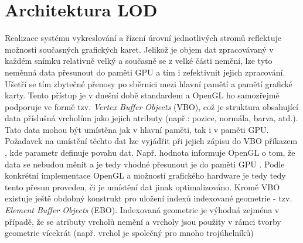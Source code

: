 \section{Architektura LOD}
\label{sec-LODarchitecture}
Realizace systému vykreslování a řízení úrovní jednotlivých stromů reflektuje možnosti současných grafických karet. Jelikož je objem dat zpracovávaný v každém snímku relativně velký a současně se z velké části nemění, lze tyto neměnná data přesunout do paměti GPU a tím i zefektivnit jejich zpracování. Ušetří se tím zbytečné přenosy po sběrnici mezi hlavní pamětí a pamětí grafické karty. Tento přístup je v dnešní době standardem a OpenGL ho samozřejmě podporuje ve formě tzv. \emph{Vertex Buffer Objects} (VBO), což je struktura obsahující data příslušná vrcholům jako jejich atributy (např.: pozice, normála, barva, atd.). Tato data mohou být umístěna jak v hlavní paměti, tak i v paměti GPU. Požadavek na umístění těchto dat lze vyjádřit při jejich zápisu do VBO příkazem , kde parametr  definuje povahu dat. Např. hodnota  informuje OpenGL o tom, že data se nebudou měnit a je tedy vhodné přesunout je do paměti GPU . Podle konkrétní implementace OpenGL a možností grafického hardware je tedy tedy tento přesun proveden, či je umístění dat jinak optimalizováno. 
Kromě VBO existuje ještě obdobný konstrukt pro uložení indexů indexované geometrie - tzv. \emph{Element Buffer Objects} (EBO). Indexovaná geometrie je výhodná zejména v případě, že se atributy vrcholů nemění a vrcholy jsou použity v rámci tvorby geometrie vícekrát (např. vrchol je společný pro mnoho trojúhelníků)

